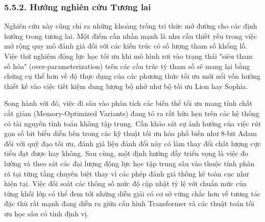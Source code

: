 \documentclass[a4paper,12pt]{article}
\begin{document}
\subsubsection{5.5.2. Hướng nghiên cứu Tương lai}

Nghiên cứu này cũng chỉ ra những khoảng trống tri thức mở đường cho các định hướng trong tương lai. Một điểm cần nhấn mạnh là nhu cầu thiết yếu trong việc mở rộng quy mô đánh giá đối với các kiến trúc có số lượng tham số khổng lồ. Việc thử nghiệm động lực học tối ưu khi mô hình rơi vào trạng thái "siêu tham số hóa" (over-parameterization) trên các cấu trúc tỷ tham số sẽ mang lại bằng chứng cụ thể hơn về độ thực dụng của các phương thức tối ưu mới nổi vốn hướng thiết kế vào việc tiết kiệm dung lượng bộ nhớ như bộ tối ưu Lion hay Sophia.

Song hành với đó, việc đi sâu vào phân tích các biến thể tối ưu mang tính chất cắt giảm (Memory-Optimized Variants) đang tỏ ra rất hứa hẹn trên các hệ thống có tài nguyên tính toán không tập trung. Cần khảo sát sự ảnh hưởng của việc rút gọn số bit biểu diễn bên trong các kỹ thuật tối ưu hóa phổ biến như 8-bit Adam đối với quỹ đạo tối ưu, đánh giá liệu đánh đổi này có làm thay đổi chất lượng cực tiểu đạt được hay không. Sau cùng, một định hướng đầy triển vọng là việc đo lường và theo sát các đại lượng động lực học tập trung sâu vào thuộc tính phân rã tại từng tầng chuyên biệt thay vì các phép đánh giá thống kê toàn cục như hiện tại. Việc đối soát các thông số mức độ cập nhật tỷ lệ với chuẩn mức của từng khối lớp có thể đem tới những diễn giải có cơ sở vững chắc hơn về tương tác đặc thù rất mạnh đang diễn ra giữa cấu hình Transformer và các thuật toán tối ưu học sâu có tính định vị.
\end{document}
